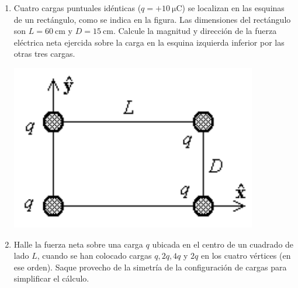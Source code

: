 \documentclass[11pt,spanish,a4paper]{article}
\begin{document}
\begin{enumerate}
	\item \begin{minipage}[t][4cm]{0.65\textwidth}
		Cuatro cargas puntuales idénticas (\(q=+\SI{10}{\micro\coulomb}\)) se localizan en las esquinas de un rectángulo, como se indica en la figura.
		Las dimensiones del rectángulo son \(L = \SI{60}{\centi\metre}\) y \(D = \SI{15}{\centi\metre}\).
		Calcule la magnitud y dirección de la fuerza eléctrica neta ejercida sobre la carga en la esquina izquierda inferior por las otras tres cargas. 
    \end{minipage}
    \begin{minipage}[c][1em][t]{0.3\textwidth}
		\includegraphics[width=\textwidth]{p1e04}
    \end{minipage}



	\item Halle la fuerza neta sobre una carga \(q\) ubicada en el centro de un cuadrado de lado \(L\), cuando se han colocado cargas \(q, 2q, 4q\) y \(2q\) en los cuatro vértices (en ese orden).
	Saque provecho de la simetría de la configuración de cargas para simplificar el cálculo.



\end{enumerate}
\end{document}
